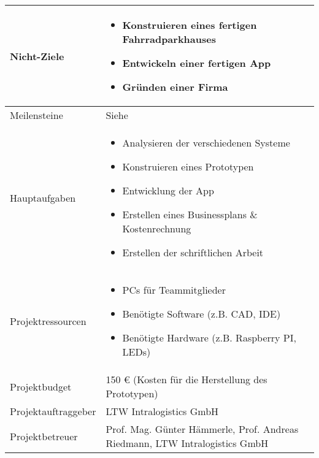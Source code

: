 \begin{longtable}{p{}|p{}}
  Nicht-Ziele           &
  \begin{itemize}
    \item Konstruieren eines fertigen Fahrradparkhauses
    \item Entwickeln einer fertigen App
    \item Gründen einer Firma
  \end{itemize}                                                                     \\
  \hline

  Meilensteine          & Siehe \nameref{tab:meilensteine}                                                               \\
  \hline

  Hauptaufgaben         &
  \begin{itemize}
    \item Analysieren der verschiedenen Systeme
    \item Konstruieren eines Prototypen
    \item Entwicklung der App
    \item Erstellen eines Businessplans \& Kostenrechnung
    \item Erstellen der schriftlichen Arbeit
  \end{itemize}                                                                   \\
  \hline

  Projektressourcen     &
  \begin{itemize}
    \item PCs für Teammitglieder
    \item Benötigte Software (z.B. \ac{CAD}, \ac{IDE})
    \item Benötigte Hardware (z.B. Raspberry PI, LEDs)
  \end{itemize}                                                                      \\
  \hline

  Projektbudget         & 150 \euro{} (Kosten für die Herstellung des Prototypen)                                        \\
  \hline

  Projektauftraggeber   & LTW Intralogistics GmbH                                                                        \\
  \hline

  Projektbetreuer       & Prof. Mag. Günter Hämmerle, Prof. Andreas Riedmann, LTW Intralogistics GmbH                    \\
  \hline


\end{longtable}
